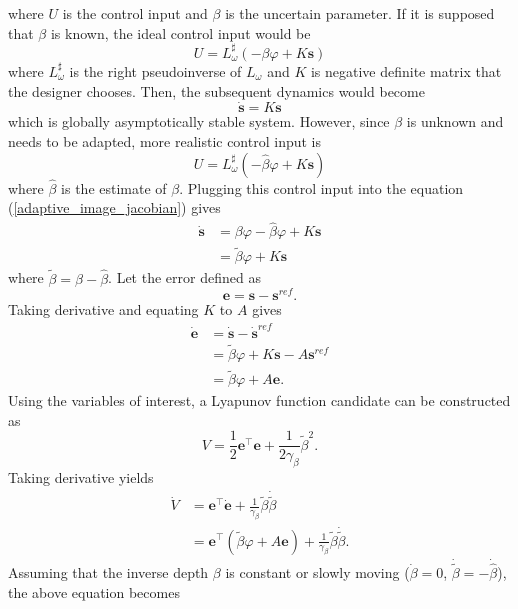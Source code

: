 where $U$ is the control input and $\beta$ is the uncertain parameter. If it is supposed that $\beta$ is known, the ideal control input would be
\begin{equation}
U=L_\omega^\sharp(-\beta\varphi+K\mathbf{s})
\end{equation}
where $L_\omega^\sharp$ is the right pseudoinverse of $L_\omega$ and $K$ is negative definite matrix that the designer chooses. Then, the subsequent dynamics would become
\begin{equation}
\mathbf{\dot{s}}=K\mathbf{s}
\end{equation}
which is globally asymptotically stable system. However, since $\beta$ is unknown and needs to be adapted, more realistic control input is
\begin{equation}
U=L_\omega^\sharp(-\hat{\beta}\varphi+K\mathbf{s})
\end{equation}
where $\hat{\beta}$ is the estimate of $\beta$. Plugging this control input into the equation (\ref{adaptive_image_jacobian}) gives
\begin{align}
\mathbf{\dot{s}}&=\beta\varphi-\hat{\beta}\varphi+K\mathbf{s}
\\&= \tilde{\beta}\varphi+K\mathbf{s}
\end{align}
where $\tilde{\beta}=\beta-\hat{\beta}$. Let the error defined as 
\begin{equation}
\mathbf{e}=\mathbf{s}-\mathbf{s}^{ref}.
\end{equation}
Taking derivative and equating $K$ to $A$ gives
\begin{align}
\dot{\mathbf{e}}&=\dot{\mathbf{s}}-\dot{\mathbf{s}}^{ref}
\\&=\tilde{\beta}\varphi+K\mathbf{s}-A\mathbf{s}^{ref}
\\&=\tilde{\beta}\varphi+A\mathbf{e}.
\end{align}
Using the variables of interest, a Lyapunov function candidate can be constructed as 
\begin{equation}
V=\frac{1}{2}\mathbf{e}^\top\mathbf{e}+\frac{1}{2\gamma_\beta}\tilde{\beta}^2.
\end{equation}
Taking derivative yields
\begin{align}
\dot{V}&=\mathbf{e}^\top\dot{\mathbf{e}}+\frac{1}{\gamma_\beta}\tilde{\beta}\dot{\tilde{\beta}}
\\&=\mathbf{e}^\top(\tilde{\beta}\varphi+A\mathbf{e})+\frac{1}{\gamma_\beta}\tilde{\beta}\dot{\tilde{\beta}}.
\label{vdot2}
\end{align}
Assuming that the inverse depth $\beta$ is constant or slowly moving ($\dot{\beta}=0$, $\dot{\tilde{\beta}}=-\dot{\hat{\beta}}$), the above equation becomes
